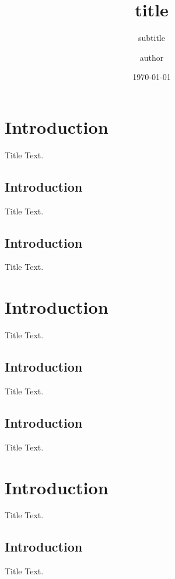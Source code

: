 \documentclass{beamer}
\date{\today}
\title{title}
\subtitle{subtitle}
\author{author}
\institute{institute}
\begin{document}
    \maketitle

    \section{Introduction}
    \begin{frame}{Title}
        Text.
    \end{frame}
    \subsection{Introduction}
    \begin{frame}{Title}
        Text.
    \end{frame}
    \subsection{Introduction}
    \begin{frame}{Title}
        Text.
    \end{frame}

    \section{Introduction}
    \begin{frame}{Title}
        Text.
    \end{frame}
    \subsection{Introduction}
    \begin{frame}{Title}
        Text.
    \end{frame}
    \subsection{Introduction}
    \begin{frame}{Title}
        Text.
    \end{frame}

    \section{Introduction}
    \begin{frame}{Title}
        Text.
    \end{frame}
    \subsection{Introduction}
    \begin{frame}{Title}
        Text.
    \end{frame}
\end{document}

